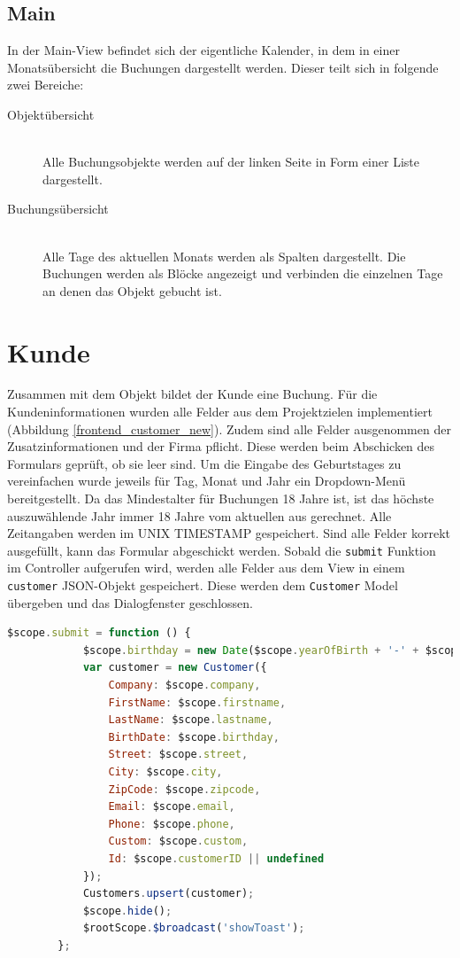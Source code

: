 \subsection{Main}
In der Main-View befindet sich der eigentliche Kalender, in dem in einer Monatsübersicht die Buchungen dargestellt werden.
Dieser teilt sich in folgende zwei Bereiche:
\begin{description}
\item[Objektübersicht]\hfill \\
Alle Buchungsobjekte werden auf der linken Seite in Form einer Liste dargestellt.
\item[Buchungsübersicht]\hfill \\ 
Alle Tage des aktuellen Monats werden als Spalten dargestellt. Die Buchungen werden als Blöcke angezeigt und verbinden die einzelnen Tage an denen das Objekt gebucht ist.  
\end{description}

\section{Kunde}
Zusammen mit dem Objekt bildet der Kunde eine Buchung. Für die Kundeninformationen wurden alle Felder aus dem Projektzielen implementiert (Abbildung \ref{frontend_customer_new}). Zudem sind alle Felder ausgenommen der Zusatzinformationen und der Firma pflicht. Diese werden beim Abschicken des Formulars geprüft, ob sie leer sind. Um die Eingabe des Geburtstages zu vereinfachen wurde jeweils für Tag, Monat und Jahr ein Dropdown-Menü bereitgestellt. Da das Mindestalter für Buchungen 18 Jahre ist, ist das höchste auszuwählende Jahr immer 18 Jahre vom aktuellen aus gerechnet. Alle Zeitangaben werden im UNIX TIMESTAMP gespeichert. Sind alle Felder korrekt ausgefüllt, kann das Formular abgeschickt werden. Sobald die \texttt{submit} Funktion im Controller aufgerufen wird, werden alle Felder aus dem View in einem \texttt{customer} JSON-Objekt gespeichert. Diese werden dem \texttt{Customer} Model übergeben und das Dialogfenster geschlossen.

\begin{lstlisting}[language=JavaScript, label=code_exampleRegistrationRequest, caption=submit Methode im customer Controller]
		$scope.submit = function () {
            $scope.birthday = new Date($scope.yearOfBirth + '-' + $scope.monthOfBirth + '-' + $scope.dayOfBirth).getTime();
            var customer = new Customer({
                Company: $scope.company,
                FirstName: $scope.firstname,
                LastName: $scope.lastname,
                BirthDate: $scope.birthday,
                Street: $scope.street,
                City: $scope.city,
                ZipCode: $scope.zipcode,
                Email: $scope.email,
                Phone: $scope.phone,
                Custom: $scope.custom,
                Id: $scope.customerID || undefined
            });
            Customers.upsert(customer);
            $scope.hide();
            $rootScope.$broadcast('showToast');
        };
\end{lstlisting}

